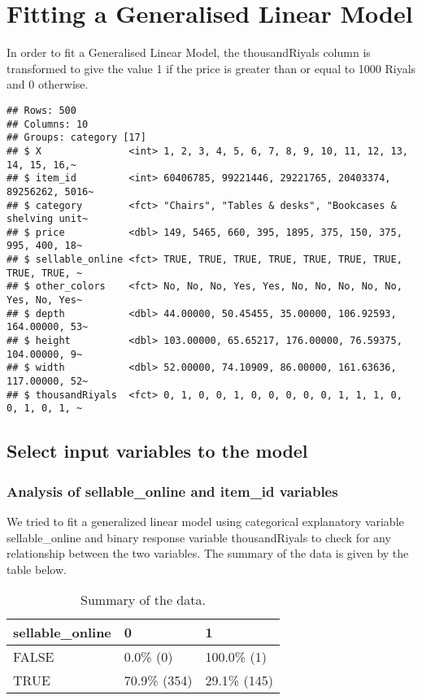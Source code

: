 \documentclass[
]{article}
\begin{document}
\hypertarget{sec:glm}{%
\section{Fitting a Generalised Linear Model}\label{sec:glm}}

In order to fit a Generalised Linear Model, the thousandRiyals column is
transformed to give the value 1 if the price is greater than or equal to
1000 Riyals and 0 otherwise.

\begin{verbatim}
## Rows: 500
## Columns: 10
## Groups: category [17]
## $ X               <int> 1, 2, 3, 4, 5, 6, 7, 8, 9, 10, 11, 12, 13, 14, 15, 16,~
## $ item_id         <int> 60406785, 99221446, 29221765, 20403374, 89256262, 5016~
## $ category        <fct> "Chairs", "Tables & desks", "Bookcases & shelving unit~
## $ price           <dbl> 149, 5465, 660, 395, 1895, 375, 150, 375, 995, 400, 18~
## $ sellable_online <fct> TRUE, TRUE, TRUE, TRUE, TRUE, TRUE, TRUE, TRUE, TRUE, ~
## $ other_colors    <fct> No, No, No, Yes, Yes, No, No, No, No, No, Yes, No, Yes~
## $ depth           <dbl> 44.00000, 50.45455, 35.00000, 106.92593, 164.00000, 53~
## $ height          <dbl> 103.00000, 65.65217, 176.00000, 76.59375, 104.00000, 9~
## $ width           <dbl> 52.00000, 74.10909, 86.00000, 161.63636, 117.00000, 52~
## $ thousandRiyals  <fct> 0, 1, 0, 0, 1, 0, 0, 0, 0, 0, 1, 1, 1, 0, 0, 1, 0, 1, ~
\end{verbatim}

\hypertarget{sec:select}{%
\subsection{Select input variables to the model}\label{sec:select}}

\hypertarget{analysis-of-sellable_online-and-item_id-variables}{%
\subsubsection{Analysis of sellable\_online and item\_id
variables}\label{analysis-of-sellable_online-and-item_id-variables}}

We tried to fit a generalized linear model using categorical explanatory
variable sellable\_online and binary response variable thousandRiyals to
check for any relationship between the two variables. The summary of the
data is given by the table below.

\begin{table}[H]

\caption{\label{tab:unnamed-chunk-1}\label{tab:reg} Summary of the data.}
\centering
\begin{tabular}[t]{l|l|l}
\hline
sellable\_online & 0 & 1\\
\hline
FALSE & 0.0\%   (0) & 100.0\%   (1)\\
\hline
TRUE & 70.9\% (354) & 29.1\% (145)\\
\hline
\end{tabular}
\end{table}
\end{document}
